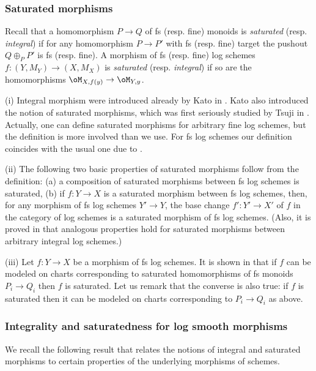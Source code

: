 \documentclass[10pt]{../fichiers-configuration-latex/smfart}
\begin{document}
\subsubsection{Saturated morphisms} Recall that a homomorphism $P\to Q$ of fs (resp. fine)
monoids is {\em saturated} (resp. {\em integral}) if for any homomorphism $P\to P'$ with
fs (resp. fine) target the pushout $Q\oplus_{P}P'$ is fs (resp. fine). A morphism of fs (resp. fine)
log schemes $f{\colon}(Y,M_Y)\to(X,M_X)$ is {\em saturated} (resp. {\em integral}) if so are
the homomorphisms $\oM_{X,f(y)}\to\oM_{Y,y}$.

\begin{remark2}\label{10-satrem}
(i) Integral morphism were introduced already by Kato in \cite[\S4]{LSFI@Kato}. Kato also
introduced the notion of saturated morphisms, which was first seriously studied by Tsuji
in \cite{Saturated@Tsuji}. Actually, one can define saturated morphisms for arbitrary fine
log schemes, but the definition is more involved than we use. For fs log schemes our definition
coincides with the usual one due to \cite[II 2.13(2)]{Saturated@Tsuji}.

(ii) The following two basic properties of saturated morphisms follow from the definition:
(a) a composition of saturated morphisms between fs log schemes is saturated,
(b) if $f{\colon}Y\to X$ is a saturated morphism between fs log schemes, then,
for any morphism of fs log schemes $Y'\to Y$, the base change $f'{\colon} Y'\to X'$ of $f$
in the category of log schemes is a saturated morphism of fs log schemes. (Also, it is proved
in \cite[II 2.11]{Saturated@Tsuji} that analogous properties hold for saturated morphisms between
arbitrary integral log schemes.)

(iii) Let $f{\colon}Y\to X$ be a morphism of fs log schemes. It is shown in \cite[II 3.5]{Saturated@Tsuji}
that if $f$ can be modeled on charts corresponding to saturated homomorphisms of fs monoids $P_i\to Q_i$
then $f$ is saturated. Let us remark that the converse is also true: if $f$ is saturated then it can be
modeled on charts corresponding to $P_i\to Q_i$ as above.
\end{remark2}

\subsubsection{Integrality and saturatedness for log smooth morphisms}
 We recall the following result that relates the notions of integral and saturated
 morphisms to certain properties of the underlying morphisms of schemes.
\end{document}
